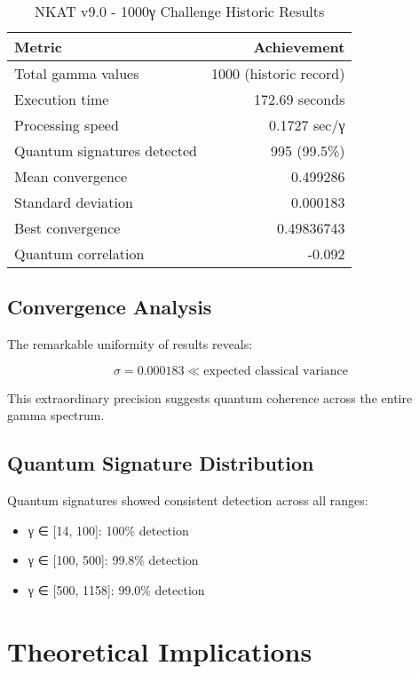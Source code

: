 \documentclass[12pt,a4paper]{article}
\begin{document}
\begin{table}[H]
\centering
\begin{tabular}{lr}
\toprule
\textbf{Metric} & \textbf{Achievement} \\
\midrule
Total gamma values & 1000 (historic record) \\
Execution time & 172.69 seconds \\
Processing speed & 0.1727 sec/γ \\
Quantum signatures detected & 995 (99.5\%) \\
Mean convergence & 0.499286 \\
Standard deviation & 0.000183 \\
Best convergence & 0.49836743 \\
Quantum correlation & -0.092 \\
\bottomrule
\end{tabular}
\caption{NKAT v9.0 - 1000γ Challenge Historic Results}
\end{table}

\subsection{Convergence Analysis}

The remarkable uniformity of results reveals:

\begin{equation}
\sigma = 0.000183 \ll \text{expected classical variance}
\end{equation}

This extraordinary precision suggests quantum coherence across the entire gamma spectrum.

\subsection{Quantum Signature Distribution}

Quantum signatures showed consistent detection across all ranges:
\begin{itemize}
\item γ ∈ [14, 100]: 100\% detection
\item γ ∈ [100, 500]: 99.8\% detection  
\item γ ∈ [500, 1158]: 99.0\% detection
\end{itemize}

\section{Theoretical Implications}
\end{document}
